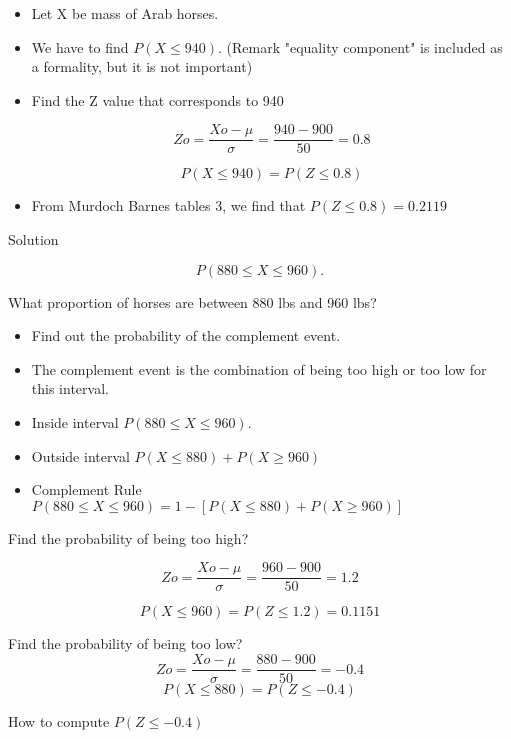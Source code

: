 \documentclass[]{report}
\begin{document}
\begin{itemize}
	\item Let X be mass of Arab horses.
	
	\item We have to find $P(X\leq940)$.            (Remark "equality component" is included as a formality, but it is not important)
	
	
	\item	Find the Z value that corresponds to 940 
	
	\[Zo=\frac{Xo-\mu}{\sigma}= \frac{940 -900}{50}= 0.8\]
	
	\[P(X \leq 940) = P(Z \leq 0.8) \]
	
	
	\item		From Murdoch Barnes tables 3, we find that $P(Z \leq 0.8) = 0.2119$
\end{itemize}





Solution 

\[P ( 880 \leq X \leq 960).\]


What proportion of horses are between 880 lbs and 960 lbs?
\begin{itemize}
	\item Find out the probability of the complement event.
	\item The complement event is the combination of being too high  or too low for this interval.
	
	\item Inside interval $P ( 880 \leq X \leq 960).$
	
	\item Outside interval $P (X \leq 880) + P(X \geq 960)$
	
	\item Complement Rule $P ( 880\leq X \leq 960)  = 1 - [P (X\leq 880) +P(X\geq 960)]$
	
\end{itemize}



Find the probability of being too high?

\[Zo=\frac{Xo-\mu}{\sigma}= \frac{960 -900}{50}= 1.2\]

\[P(X \leq 960) = P(Z \leq 1.2) = 0.1151\]


Find the probability of being too low?
\[Zo= \frac{Xo-\mu}{\sigma}= \frac{880 -900}{50}= -0.4 \]
\[P(X \leq 880) = P(Z \leq -0.4)  \]

How to compute $P(Z \leq -0.4)$
\end{document}
